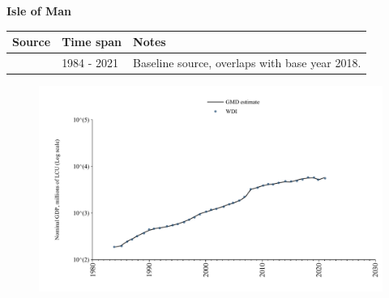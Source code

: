 \documentclass[12pt,a4paper,landscape]{article}
\begin{document}
\begin{adjustbox}{max totalsize={\paperwidth}{\paperheight},center}
\begin{minipage}[t][\textheight][t]{\textwidth}
\vspace*{0.5cm}
{}
\begin{center}
{\Large\bfseries Isle of Man}
\end{center}
\vspace{0.5cm}
\begin{table}[H]
\centering
\small
\begin{tabular}{|l|l|l|}
\hline
\textbf{Source} & \textbf{Time span} & \textbf{Notes} \\
\hline
\rowcolor{white}\cite{WDI}& 1984 - 2021 &Baseline source, overlaps with base year 2018.\\
\hline
\end{tabular}
\end{table}
\begin{figure}[H]
\centering
\includegraphics[width=\textwidth,height=0.6\textheight,keepaspectratio]{graphs/IMN_nGDP.pdf}
\end{figure}
\end{minipage}
\end{adjustbox}
\end{document}
